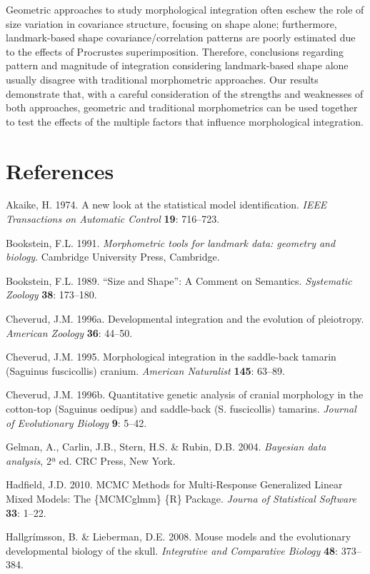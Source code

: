 \documentclass[12pt,]{article}
\begin{document}
Geometric approaches to study morphological integration often eschew the
role of size variation in covariance structure, focusing on shape alone;
furthermore, landmark-based shape covariance/correlation patterns are
poorly estimated due to the effects of Procrustes superimposition.
Therefore, conclusions regarding pattern and magnitude of integration
considering landmark-based shape alone usually disagree with traditional
morphometric approaches. Our results demonstrate that, with a careful
consideration of the strengths and weaknesses of both approaches,
geometric and traditional morphometrics can be used together to test the
effects of the multiple factors that influence morphological
integration.

\section*{References}\label{references}

Akaike, H. 1974. A new look at the statistical model identification.
\emph{IEEE Transactions on Automatic Control} \textbf{19}: 716--723.

Bookstein, F.L. 1991. \emph{Morphometric tools for landmark data:
geometry and biology}. Cambridge University Press, Cambridge.

Bookstein, F.L. 1989. ``Size and Shape'': A Comment on Semantics.
\emph{Systematic Zoology} \textbf{38}: 173--180.

Cheverud, J.M. 1996a. Developmental integration and the evolution of
pleiotropy. \emph{American Zoology} \textbf{36}: 44--50.

Cheverud, J.M. 1995. Morphological integration in the saddle-back
tamarin (Saguinus fuscicollis) cranium. \emph{American Naturalist}
\textbf{145}: 63--89.

Cheverud, J.M. 1996b. Quantitative genetic analysis of cranial
morphology in the cotton-top (Saguinus oedipus) and saddle-back (S.
fuscicollis) tamarins. \emph{Journal of Evolutionary Biology}
\textbf{9}: 5--42.

Gelman, A., Carlin, J.B., Stern, H.S. \& Rubin, D.B. 2004.
\emph{Bayesian data analysis}, 2ª ed. CRC Press, New York.

Hadfield, J.D. 2010. MCMC Methods for Multi-Response Generalized Linear
Mixed Models: The \{MCMCglmm\} \{R\} Package. \emph{Journa of
Statistical Software} \textbf{33}: 1--22.

Hallgrímsson, B. \& Lieberman, D.E. 2008. Mouse models and the
evolutionary developmental biology of the skull. \emph{Integrative and
Comparative Biology} \textbf{48}: 373--384.
\end{document}
